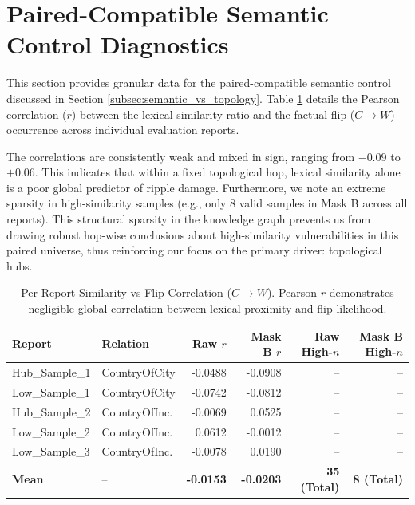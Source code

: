 \section{Paired-Compatible Semantic Control Diagnostics}
\label{app:semantic_diagnostics}

This section provides granular data for the paired-compatible semantic control discussed in Section \ref{subsec:semantic_vs_topology}. Table \ref{tab:semantic_corr} details the Pearson correlation ($r$) between the lexical similarity ratio and the factual flip ($C \rightarrow W$) occurrence across individual evaluation reports. 

The correlations are consistently weak and mixed in sign, ranging from $-0.09$ to $+0.06$. This indicates that within a fixed topological hop, lexical similarity alone is a poor global predictor of ripple damage. Furthermore, we note an extreme sparsity in high-similarity samples (e.g., only 8 valid samples in Mask B across all reports). This structural sparsity in the knowledge graph prevents us from drawing robust hop-wise conclusions about high-similarity vulnerabilities in this paired universe, thus reinforcing our focus on the primary driver: topological hubs.

\begin{table}[htbp]
\centering
\small
\begin{tabular}{llrrrr}
\toprule
\textbf{Report} & \textbf{Relation} & \textbf{Raw $r$} & \textbf{Mask B $r$} & \textbf{Raw High-$n$} & \textbf{Mask B High-$n$} \\
\midrule
Hub\_Sample\_1 & CountryOfCity & -0.0488 & -0.0908 & -- & -- \\
Low\_Sample\_1  & CountryOfCity & -0.0742 & -0.0812 & -- & -- \\
Hub\_Sample\_2& CountryOfInc. & -0.0069 &  0.0525 & -- & -- \\
Low\_Sample\_2 & CountryOfInc. &  0.0612 & -0.0012 & -- & -- \\
Low\_Sample\_3 & CountryOfInc. & -0.0078 &  0.0190 & -- & -- \\
\midrule
\textbf{Mean} & -- & \textbf{-0.0153} & \textbf{-0.0203} & \textbf{35 (Total)} & \textbf{8 (Total)} \\
\bottomrule
\end{tabular}
\caption{Per-Report Similarity-vs-Flip Correlation ($C \rightarrow W$). Pearson $r$ demonstrates negligible global correlation between lexical proximity and flip likelihood.}
\label{tab:semantic_corr}
\end{table} %
